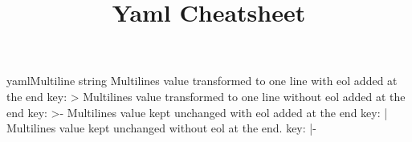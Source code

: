 \documentclass[10pt,a4paper]{article}
\title{\color{w3schools}Yaml Cheatsheet
}
\begin{document}
\maketitle
\small
\begin{multicols}{3}

\thispagestyle{empty}
\scriptsize

% 




\begin{codebox}{yaml}{Multiline string}
Multilines value transformed to one line with eol added at the end
key: >
Multilines value transformed to one line without eol added at the end
key: >-
Multilines value kept unchanged with eol added at the end
key: |
Multilines value kept unchanged without eol at the end.
key: |-

\end{codebox}


\AtNextBibliography{\footnotesize}
\printbibliography  
\end{multicols}
\end{document}
